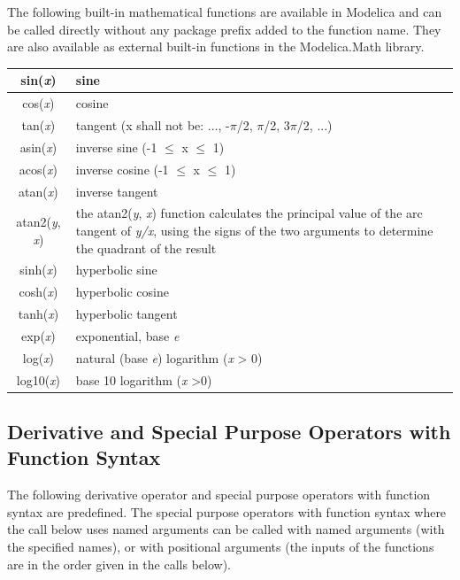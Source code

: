 \documentclass[10pt,a4paper]{report}
\def\doublelabel#1{\label{#1}}
\begin{document}
The following built-in mathematical functions are available in Modelica
and can be called directly without any package prefix added to the
function name. They are also available as external built-in functions in
the Modelica.Math library.

\begin{longtable}{|c|p{8cm}|} 
\hline \endhead 
sin(\emph{x}) & sine\\ \hline
cos(\emph{x}) & cosine\\ \hline
tan(\emph{x}) & tangent (x shall not be: ..., -$\pi$/2, $\pi$/2, 3$\pi$/2,
...)\\ \hline
asin(\emph{x}) & inverse sine (-1 $\le$ x $\le$ 1)\\ \hline
acos(\emph{x}) & inverse cosine (-1 $\le$ x $\le$ 1)\\ \hline
atan(\emph{x}) & inverse tangent\\ \hline
atan2(\emph{y}, \emph{x}) & the atan2(\emph{y},
\emph{x}) function calculates the principal value of the arc tangent of
\emph{y/x}, using the signs of the two arguments to
determine the quadrant of the result\\ \hline
sinh(\emph{x}) & hyperbolic sine\\ \hline
cosh(\emph{x}) & hyperbolic cosine\\ \hline
tanh(\emph{x}) & hyperbolic tangent\\ \hline
exp(\emph{x}) & exponential, base \emph{e}\\ \hline
log(\emph{x}) & natural (base \emph{e}) logarithm (\emph{x}
\textgreater{} 0)\\ \hline
log10(\emph{x}) & base 10 logarithm (\emph{x} \textgreater{}0)\\ \hline
\end{longtable}

\subsection{Derivative and Special Purpose Operators with Function Syntax}\doublelabel{derivative-and-special-purpose-operators-with-function-syntax}

The following derivative operator and special purpose operators with
function syntax are predefined. The special purpose operators with
function syntax where the call below uses named arguments can be called
with named arguments (with the specified names), or with positional
arguments (the inputs of the functions are in the order given in the
calls below).
\end{document}
